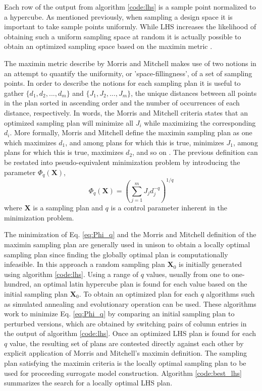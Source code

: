 Each row of the output from algorithm \ref{code:lhs} is a sample point normalized to a hypercube. As mentioned previously, when sampling a design space it is important to take sample points uniformly. While \ac{LHS} increases the likelihood of obtaining such a uniform sampling space at random it is actually possible to obtain an optimized sampling space based on the maximin metric \cite{Forrester}.

The maximin metric describe by Morris and Mitchell \cite{Morris_Mitchell} makes use of two notions in an attempt to quantify the uniformity, or 'space-fillingness', of a set of sampling points. In order to describe the notions for each sampling plan it is useful to gather $\lbrace d_1, d_2, ..., d_m\rbrace$ and $\lbrace J_1, J_2, ..., J_m\rbrace$, the unique distances between all points in the plan sorted in ascending order and the number of occurrences of each distance, respectively. In words, the Morris and Mitchell criteria states that an optimized sampling plan will minimize all $J_i$ while maximizing the corresponding $d_i$. More formally, Morris and Mitchell define the maximin sampling plan as one which maximizes $d_1$, and among plans for which this is true, minimizes $J_1$, among plans for which this is true, maximizes $d_2$, and so on \cite{Forrester}. The previous definition can be restated into pseudo-equivalent minimization problem by introducing the parameter $\Phi_q(\textbf{X})$,
\begin{equation}
\label{eq:Phi_q}
   \Phi_q(\textbf{X}) = \left(\sum_{j=1}^m J_j d_j^{-q} \right)^{1/q}
\end{equation}
where $\textbf{X}$ is a sampling plan and $q$ is a control parameter inherent in the minimization problem. 

The minimization of Eq. \ref{eq:Phi_q} and the Morris and Mitchell definition of the maximin sampling plan are generally used in unison to obtain a locally optimal sampling plan since finding the globally optimal plan is computationally infeasible. In this approach a random sampling plan $\textbf{X}_0$ is initially generated using algorithm \ref{code:lhs}. Using a range of $q$ values, usually from one to one-hundred, an optimal latin hypercube plan is found for each value based on the initial sampling plan $\textbf{X}_0$. To obtain an optimized plan for each $q$ algorithms such as simulated annealing \cite{Kirkpatrick} and evolutionary operation \cite{Box} can be used. These algorithms work to minimize Eq. \ref{eq:Phi_q} by comparing an initial sampling plan to perturbed versions, which are obtained by switching pairs of column entries in the output of algorithm \ref{code:lhs}. Once an optimized \ac{LHS} plan is found for each $q$ value, the resulting set of plans are contested directly against each other by explicit application of Morris and Mitchell's maximin definition. The sampling plan satisfying the maximin criteria is the locally optimal sampling plan to be used for proceeding surrogate model construction. Algorithm \ref{code:best_lhs} summarizes the search for a locally optimal \ac{LHS} plan.  

